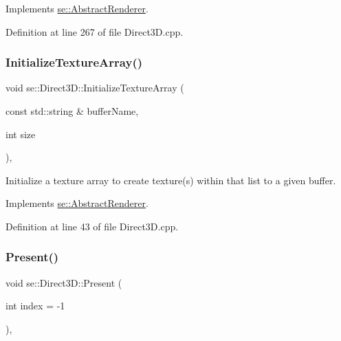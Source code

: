 Implements \mbox{\hyperlink{classse_1_1_abstract_renderer_a8af4c1bef5cf120f6160f5d93dd74207}{se\+::\+Abstract\+Renderer}}.



Definition at line 267 of file Direct3\+D.\+cpp.

\mbox{\label{classse_1_1_direct3_d_a7d5db09c1cf0c5c45f61c631b174fcf2}} 
\subsubsection{\texorpdfstring{Initialize\+Texture\+Array()}{InitializeTextureArray()}}
{\footnotesize\ttfamily void se\+::\+Direct3\+D\+::\+Initialize\+Texture\+Array (\begin{DoxyParamCaption}\item[{const std\+::string \&}]{buffer\+Name,  }\item[{int}]{size }\end{DoxyParamCaption})\hspace{0.3cm}{\ttfamily [override]}, {\ttfamily [virtual]}}

Initialize a texture array to create texture(s) within that list to a given buffer. 

Implements \mbox{\hyperlink{classse_1_1_abstract_renderer_afd7697df1d4958ec3b0fa13109a269a1}{se\+::\+Abstract\+Renderer}}.



Definition at line 43 of file Direct3\+D.\+cpp.

\mbox{\label{classse_1_1_direct3_d_a8fcf9f471230162031c50080bf8e44b5}} 
\subsubsection{\texorpdfstring{Present()}{Present()}}
{\footnotesize\ttfamily void se\+::\+Direct3\+D\+::\+Present (\begin{DoxyParamCaption}\item[{int}]{index = {\ttfamily -\/1} }\end{DoxyParamCaption})\hspace{0.3cm}{\ttfamily [override]}, {\ttfamily [virtual]}}

